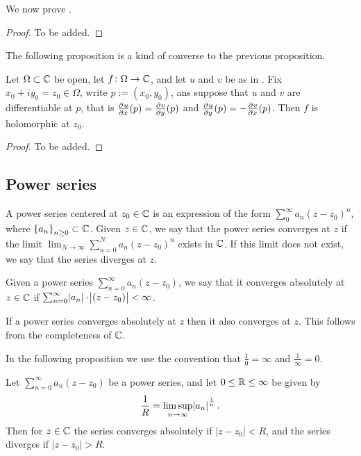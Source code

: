 \documentclass[11pt,a4paper]{article}
\newcommand{\powerseries}{\sum_{n=0}^{\infty} a_n (z - z_0)}
\begin{document}
We now prove .

\begin{proof}
  To be added.
\end{proof}

The following proposition is a kind of converse to the previous proposition.

\begin{proposition}
  Let $\Omega \subset \mathbb{C}$ be open, let $f \colon \Omega \to \mathbb{C}$,
  and let $u$ and $v$ be as in .
  Fix $x_0 + i y_0 = z_0 \in \Omega$, write $p := (x_0,y_0)$,
  ans suppose that $u$ and $v$ are differentiable at $p$,
  that is $\pd{u}{x}(p) = \pd{v}{y}(p)$ and $\pd{u}{y}(p) = - \pd{v}{x}(p)$.
  Then $f$ is holomorphic at $z_0$.
\end{proposition}
\begin{proof}
  To be added.
\end{proof}

\subsection{Power series}

\begin{definition}
  A power series centered at $z_0 \in \mathbb{C}$ is an expression of the
  form $\sum_{0}^{\infty} a_n (z - z_0)^n$,
  where $\set{a_n}_{n \geq 0} \subset \mathbb{C}$.
  Given $z \in \mathbb{C}$, we say that the power series converges at $z$ if
  the limit $\lim_{N \to \infty} \sum_{n=0}^{N} a_n (z - z_0)^n$ exists
  in $\mathbb{C}$.
  If this limit does not exist, we say that the series diverges at $z$.
\end{definition}

\begin{definition}
  Given a power series $\sum_{n=0}^{\infty} a_n (z - z_0)$,
  we say that it converges absolutely at $z \in \mathbb{C}$ if
  $\sum_{n=0}^{\infty} \abs{a_n} \cdot \abs{(z - z_0)} < \infty$.
\end{definition}

\begin{proposition}
  If a power series converges absolutely at $z$ then it also converges at $z$.
  This follows from the completeness of $\mathbb{C}$.
\end{proposition}

In the following proposition we use the convention that $\frac{1}{0} = \infty$
and $\frac{1}{\infty} = 0$.

\begin{proposition}
  \label{thm:hadamard}
  Let $\powerseries$ be a power series, and let $0 \le \mathbb{R} \le \infty$
  be given by
  \[
    \frac{1}{R} = \limsup_{n \to \infty} \abs{a_n}^{\frac 1n}.
  \]
  Then for $z \in \mathbb{C}$ the series converges absolutely if $|z - z_0| < R$,
  and the series diverges if $|z - z_0| > R$.
\end{proposition}
\end{document}
